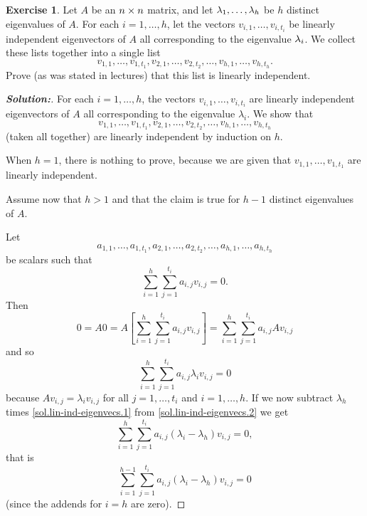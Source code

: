 \documentclass[a4paper]{amsart}
\theoremstyle{definition}
\newtheorem{exercise}{Exercise}
\newenvironment{solution}{\begin{proof}[\textbf{Solution:}] \vphantom{u}}{\end{proof}}
\begin{document}
\begin{exercise}\label{ex-evectors-independent}
 Let $A$ be an $n\times n$ matrix, and let $\lambda_1,\dotsc,\lambda_h$ be $h$ distinct
 eigenvalues of $A$.   For each $i=1,\dotsc,h$, let the vectors
 $v_{i,1},\dotsc,v_{i,t_i}$ be linearly independent eigenvectors of
 $A$ all corresponding to the eigenvalue $\lambda_i$.  We collect these
 lists together into a single list 
 \[ v_{1,1},\dotsc,v_{1,t_1},
    v_{2,1},\dotsc,v_{2,t_2},\dotsc,
    v_{h,1},\dotsc,v_{h,t_h}.
 \]
 Prove (as was stated in lectures) that this list is linearly independent.
\end{exercise}
\begin{solution}
 For each $i = 1, \ldots, h$, the vectors $v_{i,1}, \ldots,
 v_{i,t_i}$ are linearly independent eigenvectors of $A$ all
 corresponding to the eigenvalue
 $\lambda_i$. We show that
 \[
 v_{1,1}, \ldots, v_{1,t_1},
 v_{2,1}, \ldots, v_{2,t_2},
 \ldots,
 v_{h,1}, \ldots, v_{h,t_h}
 \]
 (taken all together) are linearly independent by induction on $h$.

 When $h = 1$, there is nothing to prove, because we are given that
 $v_{1,1}, \ldots, v_{1,t_1}$ are linearly independent.

 Assume now that $h>1$ and that the claim is true for $h-1$
 distinct eigenvalues of $A$.

 Let
 \[
 a_{1,1}, \ldots, a_{1,t_1},
 a_{2,1}, \ldots, a_{2,t_2},
 \ldots,
 a_{h,1}, \ldots, a_{h,t_h}
 \]
 be scalars such that
 \begin{equation}
 \sum_{i=1}^h \sum_{j=1}^{t_i} a_{i,j}v_{i,j} = 0.
 \label{sol.lin-ind-eigenvecs.1}
 \end{equation}
 Then
 \[
 0 = A0 = A\left[\sum_{i=1}^h \sum_{j=1}^{t_i} a_{i,j}v_{i,j}\right]
 = \sum_{i=1}^h \sum_{j=1}^{t_i} a_{i,j}Av_{i,j}
 \]
 and so
 \begin{equation}
 \sum_{i=1}^h \sum_{j=1}^{t_i} a_{i,j}\lambda_iv_{i,j} = 0
 \label{sol.lin-ind-eigenvecs.2}
 \end{equation}
 because $Av_{i,j} = \lambda_iv_{i,j}$ for all $j = 1, \ldots, t_i$ and
 $i = 1, \ldots, h$. If we
 now subtract $\lambda_h$ times \eqref{sol.lin-ind-eigenvecs.1} from
 \eqref{sol.lin-ind-eigenvecs.2} we get
 \[
 \sum_{i=1}^h \sum_{j=1}^{t_i} a_{i,j}(\lambda_i - \lambda_h)v_{i,j} = 0,
 \]
 that is
 \[
 \sum_{i=1}^{h-1} \sum_{j=1}^{t_i} a_{i,j}(\lambda_i - \lambda_h)v_{i,j} = 0
 \]
 (since the addends for $i=h$ are zero).


\end{solution}
\end{document}
